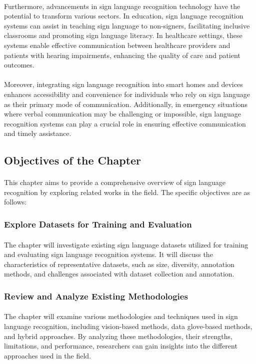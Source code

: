 \paragraph{}
Furthermore, advancements in sign language recognition technology have the potential to transform various sectors. In education, sign language recognition systems can assist in teaching sign language to non-signers, facilitating inclusive classrooms and promoting sign language literacy. In healthcare settings, these systems enable effective communication between healthcare providers and patients with hearing impairments, enhancing the quality of care and patient outcomes.
\paragraph{}
Moreover, integrating sign language recognition into smart homes and devices enhances accessibility and convenience for individuals who rely on sign language as their primary mode of communication. Additionally, in emergency situations where verbal communication may be challenging or impossible, sign language recognition systems can play a crucial role in ensuring effective communication and timely assistance.
\subsection{Objectives of the Chapter}
\paragraph{}
This chapter aims to provide a comprehensive overview of sign language recognition by exploring related works in the field. The specific objectives are as follows:
\subsubsection{Explore Datasets for Training and Evaluation}
\paragraph{}
The chapter will investigate existing sign language datasets utilized for training and evaluating sign language recognition systems. It will discuss the characteristics of representative datasets, such as size, diversity, annotation methods, and challenges associated with dataset collection and annotation.
\subsubsection{Review and Analyze Existing Methodologies}
\paragraph{}
The chapter will examine various methodologies and techniques used in sign language recognition, including vision-based methods, data glove-based methods, and hybrid approaches. By analyzing these methodologies, their strengths, limitations, and performance, researchers can gain insights into the different approaches used in the field.